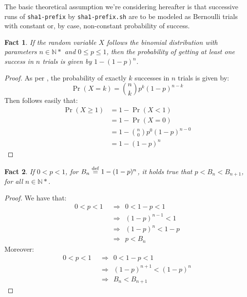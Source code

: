 \documentclass[a4paper,9pt,leqno]{article}
\renewcommand{\=}{\protect\nobreakdash-\hspace{0pt}}
\renewcommand{\~}{\protect\nobreakdash--\hspace{0pt}}
\newcommand{\code}[1]{{\tt{#1}}}
\theoremstyle{plain}
\newtheorem{fact}{Fact}
\theoremstyle{definition}
\theoremstyle{remark}
\newcommand{\impll}{\:\:\Longrightarrow\:\:}
\newcommand{\impl}{\impll}%
\newcommand{\by}[1]{{#1}}
\newcommand{\bydef}{\by{def}}
\newcommand{\eq}{=}
\newcommand{\eqby}[1]{\symbyrm{#1}{=}}
\newcommand{\eqbydef}{\eqby{\bydef}}
\newcommand{\symby}[2]{\stackrel{#1}{{#2}}}
\newcommand{\symbyrm}[2]{\symby{{\rm\scriptstyle{#1}}}{#2}}
\newcommand{\lt}{<}
\newcommand\Nat{\mathbb{N}}
\newcommand\Nat*{\mathbb{N}^*}
\begin{document}
The basic theoretical assumption we're considering hereafter
is that successive runs of \code{sha1-prefix} by \code{sha1-prefix.sh}
are to be modeled as Bernoulli trials \cite{wiki:bernoullitrial} with
constant or, by case, non-constant probability of success.
%
\begin{fact}\label{binomial:probability}
If the random variable $X$ follows the binomial distribution
with parameters $n \in \Nat*$ and $0 \le p \le 1$, then the
probability of getting \emph{at least one success} in $n$ trials
is given by $1 - (1 - p)^n$.
\end{fact}

\begin{proof}
As per \cite{wiki:binomialdist}, the probability of exactly
$k$ successes in $n$ trials is given by:
%
\begin{equation*}
\Pr(X \eq k) = {n\choose k} p^k (1-p)^{n-k} 
\end{equation*}
%
Then follows easily that:
%
\begin{align*}
\Pr(X \ge 1) & = 1 - \Pr(X \lt 1) \\
             & = 1 - \Pr(X \eq 0) \\
             & = 1 - {n\choose 0} p^0 (1-p)^{n - 0} \\
             & = 1 - (1 - p)^n
\end{align*}
%
\end{proof}

\begin{fact}
If $0 \lt p \lt 1$,
for $B_n \eqbydef 1 - (1 - p)^n$, it holds true that
$p \lt B_n \lt B_{n+1}$, for all $n \in \Nat*$.
\end{fact}

\begin{proof}
%
We have that:
%
\begin{align*}
0 \lt p \lt 1 & \impl 0 \lt 1 - p \lt 1 \\
              & \impl (1 - p)^{n-1} \lt 1 \\
              & \impl (1 - p)^n \lt 1 - p \\
              & \impl p \lt B_n
\end{align*}
%
Moreover:
%
\begin{align*}
0 \lt p \lt 1 & \impl 0 \lt 1 - p \lt 1 \\
              & \impl (1 - p)^{n+1} \lt (1 - p)^n \\
              & \impl B_n \lt B_{n+1}
\end{align*}
%
\end{proof}
\end{document}
